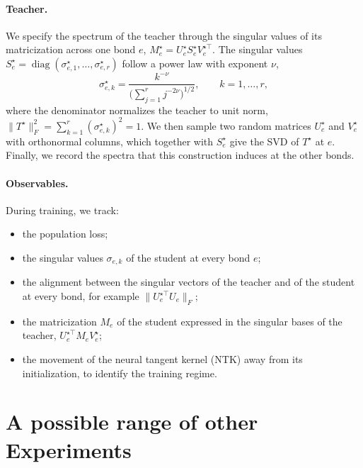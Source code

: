 \documentclass[11pt]{article}
\newcommand{\diag}{\operatorname{diag}}
\newcommand{\norm}[1]{\lVert #1\rVert}
\theoremstyle{definition}
\numberwithin{equation}{section}
\begin{document}
\paragraph{Teacher.} We specify the spectrum of the teacher through the singular values of its matricization across one bond $e$, $M^\star_e=U^\star_eS^\star_eV^{\star\top}_e$. The singular values $S^\star_e=\diag(\sigma^\star_{e,1},\dots,\sigma^\star_{e,r})$ follow a power law with exponent $\nu$,
\[
\sigma^\star_{e,k}=\frac{k^{-\nu}}{\big(\sum_{j=1}^{r}j^{-2\nu}\big)^{1/2}},\qquad k=1,\dots,r,
\]
where the denominator normalizes the teacher to unit norm, $\norm{T^\star}_F^2=\sum_{k=1}^r(\sigma^\star_{e,k})^2=1$. We then sample two random matrices $U^\star_e$ and $V^\star_e$ with orthonormal columns, which together with $S^\star_e$ give the SVD of $T^\star$ at $e$. Finally, we record the spectra that this construction induces at the other bonds.

\paragraph{Observables.} During training, we track:
\begin{itemize}[nosep]
\item the population loss;
\item the singular values $\sigma_{e,k}$ of the student at every bond $e$;
\item the alignment between the singular vectors of the teacher and of the student at every bond, for example $\norm{U^{\star\top}_eU_e}_F$;
\item the matricization $M_e$ of the student expressed in the singular bases of the teacher, $U^{\star\top}_eM_eV^\star_e$;
\item the movement of the neural tangent kernel (NTK) away from its initialization, to identify the training regime.
\end{itemize}

\section{A possible range of other Experiments}\label{sec:experiments}

\end{document}
